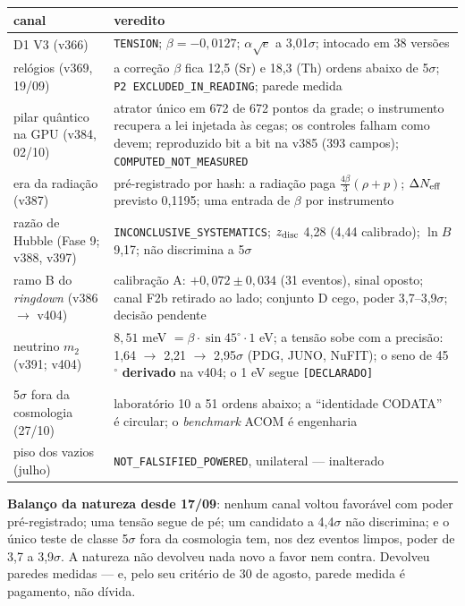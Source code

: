 \begin{center}\small
\begin{tabular}{p{}p{}}
\textbf{canal} & \textbf{veredito} \\ \hline
D1 V3 (v366) & \texttt{TENSION}; $\beta = -0{,}0127$; $\alpha\sqrt e$ a 3,01$\sigma$; intocado em
38 versões \\
relógios (v369, 19/09) & a correção $\beta$ fica 12,5 (Sr) e 18,3 (Th) ordens abaixo de 5$\sigma$;
\texttt{P2 EXCLUDED\_IN\_READING}; parede medida \\
pilar quântico na GPU (v384, 02/10) & atrator único em 672 de 672 pontos da grade; o instrumento
recupera a lei injetada às cegas; os controles falham como devem; reproduzido bit a bit na v385
(393 campos); \texttt{COMPUTED\_NOT\_MEASURED} \\
era da radiação (v387) & pré-registrado por hash: a radiação paga $\tfrac{4\beta}{3}(\rho+p)$;
$\Delta N_{\rm eff}$ previsto 0,1195; uma entrada de $\beta$ por instrumento \\
razão de Hubble (Fase 9; v388, v397) & \texttt{INCONCLUSIVE\_SYSTEMATICS}; $z_{\rm disc}$ 4,28
(4,44 calibrado); $\ln B$ 9,17; não discrimina a 5$\sigma$ \\
ramo B do \emph{ringdown} (v386 $\to$ v404) & calibração A: $+0{,}072 \pm 0{,}034$ (31 eventos),
sinal oposto; canal F2b retirado ao lado; conjunto D cego, poder 3,7--3,9$\sigma$; decisão
pendente \\
neutrino $m_2$ (v391; v404) & $8{,}51$ meV $= \beta\cdot\sin 45^\circ\cdot 1$ eV; a tensão sobe
com a precisão: 1,64 $\to$ 2,21 $\to$ 2,95$\sigma$ (PDG, JUNO, NuFIT); o seno de 45$^\circ$
\textbf{derivado} na v404; o 1 eV segue \texttt{[DECLARADO]} \\
5$\sigma$ fora da cosmologia (27/10) & laboratório 10 a 51 ordens abaixo; a ``identidade CODATA''
é circular; o \emph{benchmark} ACOM é engenharia \\
piso dos vazios (julho) & \texttt{NOT\_FALSIFIED\_POWERED}, unilateral --- inalterado \\
\end{tabular}
\end{center}

\textbf{Balanço da natureza desde 17/09}: nenhum canal voltou favorável com poder pré-registrado;
uma tensão segue de pé; um candidato a 4,4$\sigma$ não discrimina; e o único teste de classe
5$\sigma$ fora da cosmologia tem, nos dez eventos limpos, poder de 3,7 a 3,9$\sigma$. A natureza
não devolveu nada novo a favor nem contra. Devolveu paredes medidas --- e, pelo seu critério de
30 de agosto, parede medida é pagamento, não dívida.

